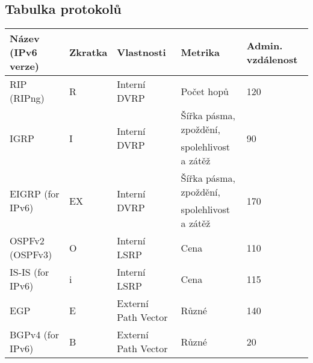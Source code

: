 \subsection{Tabulka protokolů}
\begin{tabularx}{\linewidth}{l|l|l|l|l}
    \textbf{Název (IPv6 verze)}           & \textbf{Zkratka}        & \textbf{Vlastnosti}               & \textbf{Metrika}       & \textbf{Admin. vzdálenost} \\
    \hline
    RIP (RIPng)                           & R                       & Interní DVRP                      & Počet hopů             & 120                        \\
    \hline
    \multirow{2}{8em}{{IGRP}}             & \multirow{2}{5em}{{I}}  & \multirow{2}{8em}{{Interní DVRP}} & Šířka pásma, zpoždění, & \multirow{2}{5em}{{90}}    \\
                                          &                         &                                   & spolehlivost a zátěž                                \\
    \hline
    \multirow{2}{8em}{{EIGRP (for IPv6)}} & \multirow{2}{5em}{{EX}} & \multirow{2}{8em}{{Interní DVRP}} & Šířka pásma, zpoždění, & \multirow{2}{5em}{{170}}   \\
                                          &                         &                                   & spolehlivost a zátěž                                \\
    \hline
    OSPFv2 (OSPFv3)                       & O                       & Interní LSRP                      & Cena                   & 110                        \\
    \hline
    IS-IS (for IPv6)                      & i                       & Interní LSRP                      & Cena                   & 115                        \\
    \hline
    EGP                                   & E                       & Externí Path Vector               & Různé                  & 140                        \\
    \hline
    BGPv4 (for IPv6)                      & B                       & Externí Path Vector               & Různé                  & 20                         \\
\end{tabularx}
